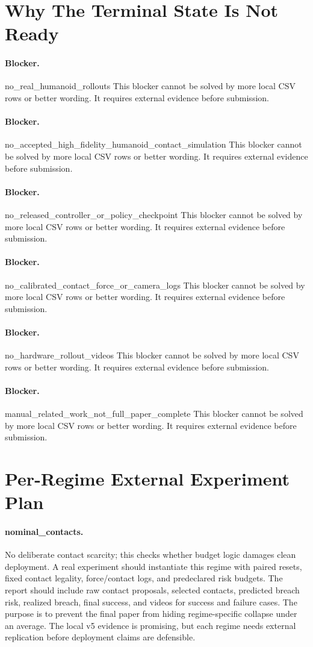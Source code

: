 \documentclass{article}
\begin{document}
\section{Why The Terminal State Is Not Ready}
\paragraph{Blocker.} no\_real\_humanoid\_rollouts This blocker cannot be solved by more local CSV rows or better wording. It requires external evidence before submission.
\paragraph{Blocker.} no\_accepted\_high\_fidelity\_humanoid\_contact\_simulation This blocker cannot be solved by more local CSV rows or better wording. It requires external evidence before submission.
\paragraph{Blocker.} no\_released\_controller\_or\_policy\_checkpoint This blocker cannot be solved by more local CSV rows or better wording. It requires external evidence before submission.
\paragraph{Blocker.} no\_calibrated\_contact\_force\_or\_camera\_logs This blocker cannot be solved by more local CSV rows or better wording. It requires external evidence before submission.
\paragraph{Blocker.} no\_hardware\_rollout\_videos This blocker cannot be solved by more local CSV rows or better wording. It requires external evidence before submission.
\paragraph{Blocker.} manual\_related\_work\_not\_full\_paper\_complete This blocker cannot be solved by more local CSV rows or better wording. It requires external evidence before submission.
\clearpage
\section{Per-Regime External Experiment Plan}
\paragraph{nominal\_contacts.} No deliberate contact scarcity; this checks whether budget logic damages clean deployment. A real experiment should instantiate this regime with paired resets, fixed contact legality, force/contact logs, and predeclared risk budgets. The report should include raw contact proposals, selected contacts, predicted breach risk, realized breach, final success, and videos for success and failure cases.
The purpose is to prevent the final paper from hiding regime-specific collapse under an average. The local v5 evidence is promising, but each regime needs external replication before deployment claims are defensible.
\end{document}
